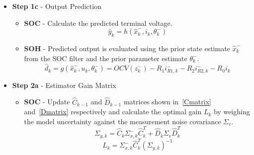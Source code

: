 \begin{itemize}
\begin{itemize}
\begin{equation}
                \Sigma_{x,k}^- = \hat{A}_{k-1} \Sigma_{x,k-1}^+ \hat{A}_{k-1}^T + \hat{B}_{k-1} \Sigma_w \hat{B}_{k-1}^T
            \end{equation}
            \item[\(\circ\)] \textbf{\acs{SOH}} - Predict the parameter uncertainty forward, accounting for the process noise covariance $\Sigma_{r,k-1}$
            \begin{equation}
                \Sigma_{\theta,k}^- = \Sigma_{\theta,k-1}^+ + \Sigma_{r,k-1}
            \end{equation}
        \end{itemize}
    \item \textbf{Step 1c} - Output Prediction
        \begin{itemize}
            \item[\(\circ\)] \textbf{\acs{SOC}} - Calculate the predicted terminal voltage.
            \begin{equation}
                \hat{y}_k = h(\hat{x}_k^-, i_k, \theta_k^-)
            \end{equation}
            \item[\(\circ\)] \textbf{\acs{SOH}} - Predicted output is evaluated using the prior state estimate $\hat{x}_k^-$ 
            from the \acs{SOC} filter and the prior parameter estimate $\theta_k^-$.
            \begin{equation}
                \hat{d}_k = g(\hat{x}_k^-, u_k, \theta_k^-) = OCV(z_k^-) - R_1 i_{R1,k}^- - R_2 i_{R2,k}^- - R_0 i_k
            \end{equation}
        \end{itemize}
    \item \textbf{Step 2a} - Estimator Gain Matrix
        \begin{itemize}
            \item[\(\circ\)] \textbf{\acs{SOC}} - Update $\hat{C}_{k-1}$ and $\hat{D}_{k-1}$ matrices shown in~\eqref{Cmatrix} and~\eqref{Dmatrix} 
            respectively and calculate the optimal gain $L_k$ by weighing the model uncertainty against the measurement noise 
            covariance $\Sigma_v$.
            \begin{equation}
                \Sigma_{y,k} =  \hat{C}_k \Sigma_{x,k}^- \hat{C}_k^T + \hat{D}_k \Sigma_v \hat{D}_k^T
            \end{equation}
            \begin{equation}
                L_k = \Sigma_{x,k}^- \hat{C}_k^T (\Sigma_{y,k})^{-1}
            \end{equation}

\end{itemize}
\end{itemize}
